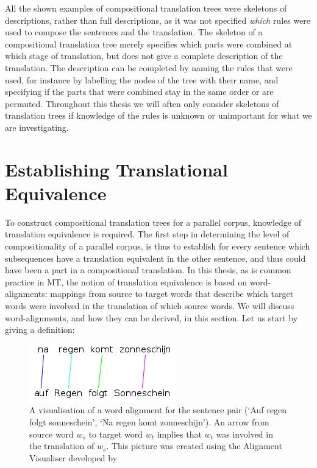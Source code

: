 All the shown examples of compositional translation trees were skeletons of descriptions, rather than full descriptions, as it was not specified \textit{which} rules were used to compose the sentences and the translation. The skeleton of a compositional translation tree merely specifies which parts were combined at which stage of translation, but does not give a complete description of the translation. The description can be completed by naming the rules that were used, for instance by labelling the nodes of the tree with their name, and specifying if the parts that were combined stay in the same order or are permuted. Throughout this thesis we will often only consider skeletons of translation trees if knowledge of the rules is unknown or unimportant for what we are investigating.


\section{Establishing Translational Equivalence}
\label{sec:trans_eq}

To construct compositional translation trees for a parallel corpus, knowledge of translation equivalence is required. The first step in determining the level of compositionality of a parallel corpus, is thus to establish for every sentence which subsequences have a translation equivalent in the other sentence, and thus could have been a part in a compositional translation. In this thesis, as is common practice in MT, the notion of translation equivalence is based on word-alignments: mappings from source to target words that describe which target words were involved in the translation of which source words. We will discuss word-alignments, and how they can be derived, in this section. Let us start by giving a definition:

\begin{figure}
\begin{framed}
\centering
\includegraphics[scale=0.6]{Graphics/alignment.png}
\caption{A visualisation of a word alignment for the sentence pair (`Auf regen folgt sonneschein', `Na regen komt zonneschijn'). An arrow from source word $w_s$ to target word $w_t$ implies that $w_t$ was involved in the translation of $w_s$. This picture was created using the Alignment Visualiser developed by \cite{maillette2010visualizing}}
\label{fig:alignment}
\end{framed}
\end{figure}

